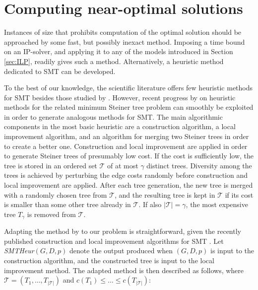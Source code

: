 \section{Computing near-optimal solutions} \label{sec:heur}

Instances of size that prohibits computation of the optimal solution should be approached by some fast, but possibly inexact method.
Imposing a time bound on an IP-solver, and applying it to any of the models introduced in Section \ref{sec:ILP}, readily gives such a method.
Alternatively, a heuristic method dedicated to SMT can be developed.

To the best of our knowledge, the scientific literature offers few heuristic methods for SMT besides those studied by \citet{ivanova16isco}.
However, recent progress by \citet{pajor18} on heuristic methods for the related minimum Steiner tree problem can smoothly be exploited in order to generate analogous methods for SMT.
The main algorithmic components in the most basic heuristic are a construction algorithm, a local improvement algorithm,
and an algorithm for merging two Steiner trees in order to create a better one.
Construction and local improvement are applied in order to generate Steiner trees of presumably low cost.
If the cost is sufficiently low, the tree is stored in an ordered set $\mathcal{T}$ of at most $\gamma$ distinct trees.
Diversity among the trees is achieved by perturbing the edge costs randomly before construction and local improvement are applied.
After each tree generation, the new tree is merged with a randomly chosen tree from $\mathcal{T}$, 
and the resulting tree is kept in $\mathcal{T}$ if its cost is smaller than some other tree already in $\mathcal{T}$.
If also $|\mathcal{T}|=\gamma$, the most expensive tree $T_{\gamma}$ is removed from $\mathcal{T}$.

Adapting the method by \citet{pajor18} to our problem is straightforward,
given the recently published construction and local improvement algorithms for SMT \citep{ivanova16isco}.
Let \textit{SMTHeur}$(G,D,p)$ denote the output produced when $(G,D,p)$ is input to the construction algorithm,
and the constructed tree is input to the local improvement method.
The adapted method is then described as follows, where $\mathcal{T}=\left(T_1,\ldots,T_{|\mathcal{T}|}\right)$
and $c\left(T_1\right)\leq\dots\leq c\left(T_{|\mathcal{T}|}\right)$:

